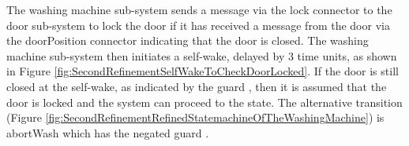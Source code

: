 The washing machine sub-system sends a message via the lock connector to the door sub-system to lock the door if it has received a message from the door via the doorPosition connector indicating that the door is closed.  The washing machine sub-system then initiates a self-wake, delayed by 3 time units, as shown in Figure \ref{fig:SecondRefinementSelfWakeToCheckDoorLocked}. If the door is still closed at the self-wake, as indicated by the guard 
 ,  then it is assumed that the door is locked and the system can proceed to the   state. The alternative transition (Figure \ref{fig:SecondRefinementRefinedStatemachineOfTheWashingMachine}) is abortWash which has the negated guard  .
 
 \begin{figure}[!htbp]
  \centering
  
      

\end{figure}
